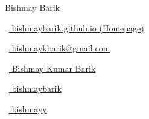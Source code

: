 \vspace*{-0.10em}
\begin{Large} 
	Bishmay Barik
\end{Large}

\begin{footnotesize}
	\begin{tiny}\faHome\end{tiny}~\href{https://bishmaybarik.github.io}{
		bishmaybarik.github.io (Homepage)
	}
	\quad \begin{tiny}\faEnvelope[regular]\end{tiny}~\href{mailto:bishmaykbarik@gmail.com}{%
		bishmaykbarik@gmail.com
	} 	\\
	\begin{tiny}\faLinkedinIn\end{tiny}~\href{https://www.linkedin.com/in/bishmaybarik/}{
		Bishmay Kumar Barik
	}
	\quad 
	\begin{tiny}\faGithub\end{tiny}~\href{https://github.com/bishmaybarik}{
		bishmaybarik
	}
	\quad 
	\begin{tiny}\faTwitter\end{tiny}~\href{https://x.com/bishmayy}{
		bishmayy
	}
\end{footnotesize}
